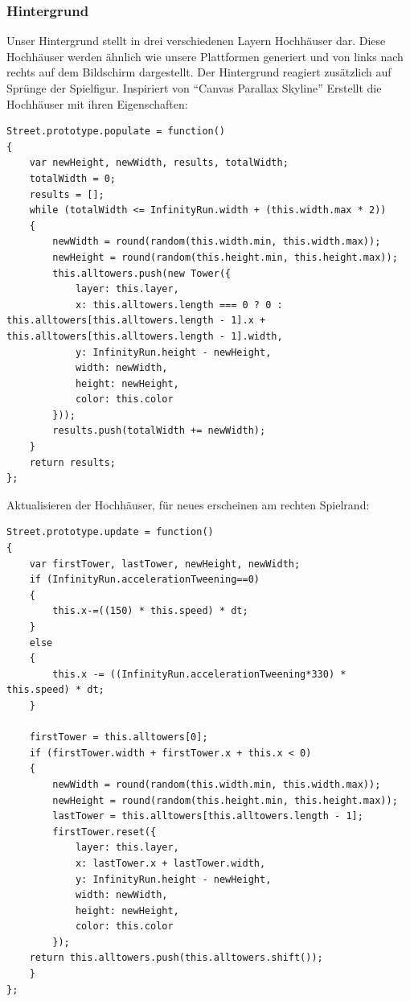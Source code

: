 \subsubsection{Hintergrund}
Unser Hintergrund stellt in drei verschiedenen Layern Hochhäuser dar. Diese Hochhäuser werden ähnlich wie unsere Plattformen generiert und von links nach rechts auf dem Bildschirm dargestellt. Der Hintergrund reagiert zusätzlich auf Sprünge der Spielfigur. Inspiriert von ``Canvas Parallax Skyline'' \cite{background}
Erstellt die Hochhäuser mit ihren Eigenschaften:
\begin{lstlisting}[frame=single]
Street.prototype.populate = function() 
{
	var newHeight, newWidth, results, totalWidth;
	totalWidth = 0;
	results = [];
	while (totalWidth <= InfinityRun.width + (this.width.max * 2)) 
	{
		newWidth = round(random(this.width.min, this.width.max));
		newHeight = round(random(this.height.min, this.height.max));
		this.alltowers.push(new Tower({
			layer: this.layer,
			x: this.alltowers.length === 0 ? 0 : this.alltowers[this.alltowers.length - 1].x + this.alltowers[this.alltowers.length - 1].width,
			y: InfinityRun.height - newHeight,
			width: newWidth,
			height: newHeight,
			color: this.color
		}));
		results.push(totalWidth += newWidth);
	}
	return results;
};
\end{lstlisting}
Aktualisieren der Hochhäuser, für neues erscheinen am rechten Spielrand:
\begin{lstlisting}[frame=single]
Street.prototype.update = function() 
{
	var firstTower, lastTower, newHeight, newWidth;
	if (InfinityRun.accelerationTweening==0)
	{
		this.x-=((150) * this.speed) * dt;
	}
	else
	{
		this.x -= ((InfinityRun.accelerationTweening*330) * this.speed) * dt;
	}

	firstTower = this.alltowers[0];
	if (firstTower.width + firstTower.x + this.x < 0) 
	{
		newWidth = round(random(this.width.min, this.width.max));
		newHeight = round(random(this.height.min, this.height.max));
		lastTower = this.alltowers[this.alltowers.length - 1];
		firstTower.reset({
			layer: this.layer,
			x: lastTower.x + lastTower.width,
			y: InfinityRun.height - newHeight,
			width: newWidth,
			height: newHeight,
			color: this.color
		});
	return this.alltowers.push(this.alltowers.shift());
	}
};
\end{lstlisting}
\newpage
